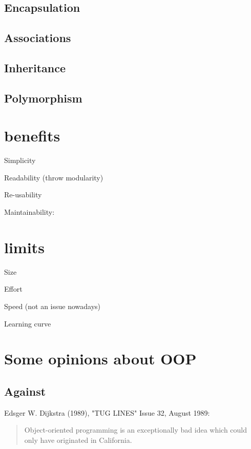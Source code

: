 \documentclass[12pt]{book}
\begin{document}
\subsection{Encapsulation}

\subsection{Associations}

\subsection{Inheritance}

\subsection{Polymorphism}


\section{benefits}


Simplicity

Readability (throw modularity)

Re-usability

Maintainability: 


\section{limits}

Size 

Effort

Speed (not an issue nowadays)

Learning curve


\section{Some opinions about OOP}

\subsection{Against}

Edsger W. Dijkstra (1989), "TUG LINES" Issue 32, August 1989:
\begin{quote}
	Object-oriented programming is an exceptionally bad idea which could only have originated in California.
\end{quote}
\end{document}
